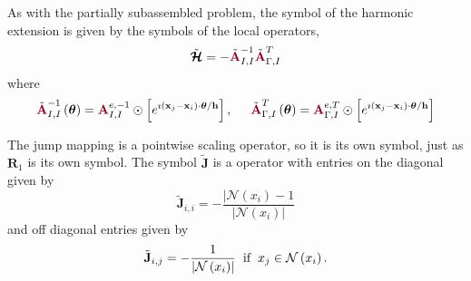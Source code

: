 As with the partially subassembled problem, the symbol of the harmonic extension is given by the symbols of the local operators,
\begin{equation}
\tilde{\boldsymbol{\mathcal{H}}} = - \tilde{{\color{burgundy}\mathbf{A}}}_{I, I}^{-1} \tilde{{\color{burgundy}\mathbf{A}}}_{\Gamma, I}^T
\end{equation}
where
\begin{equation}
\tilde{{\color{burgundy}\mathbf{A}}}_{I, I}^{-1} \left( \boldsymbol{\theta} \right) = {\color{burgundy}\mathbf{A}}_{I, I}^{e, -1} \odot \left[ e^{\imath \left( \mathbf{x}_j - \mathbf{x}_i \right) \cdot \boldsymbol{\theta} / \mathbf{h}} \right],
\hspace{5mm}
\tilde{{\color{burgundy}\mathbf{A}}}_{\Gamma, I}^T \left( \boldsymbol{\theta} \right) = {\color{burgundy}\mathbf{A}}_{\Gamma, I}^{e, T} \odot \left[ e^{\imath \left( \mathbf{x}_j - \mathbf{x}_i \right) \cdot \boldsymbol{\theta} / \mathbf{h}} \right]
\end{equation}

The jump mapping is a pointwise scaling operator, so it is its own symbol, just as $\mathbf{R}_1$ is its own symbol.
The symbol $\tilde{\mathbf{J}}$ is a operator with entries on the diagonal given by
\begin{equation}
\tilde{\mathbf{J}}_{i, i} = - \frac{\lvert \mathcal{N} \left( x_i \right) - 1}{\lvert \mathcal{N} \left( x_i \right) \rvert}
\end{equation}
and off diagonal entries given by
\begin{equation}
\tilde{\mathbf{J}}_{i, j} = - \frac{1}{\lvert \mathcal{N} \left( x_i \right) \rvert} \hspace{2mm} \text{if} \hspace{2mm} x_j \in \mathcal{N} \left( x_i \right).
\end{equation}

